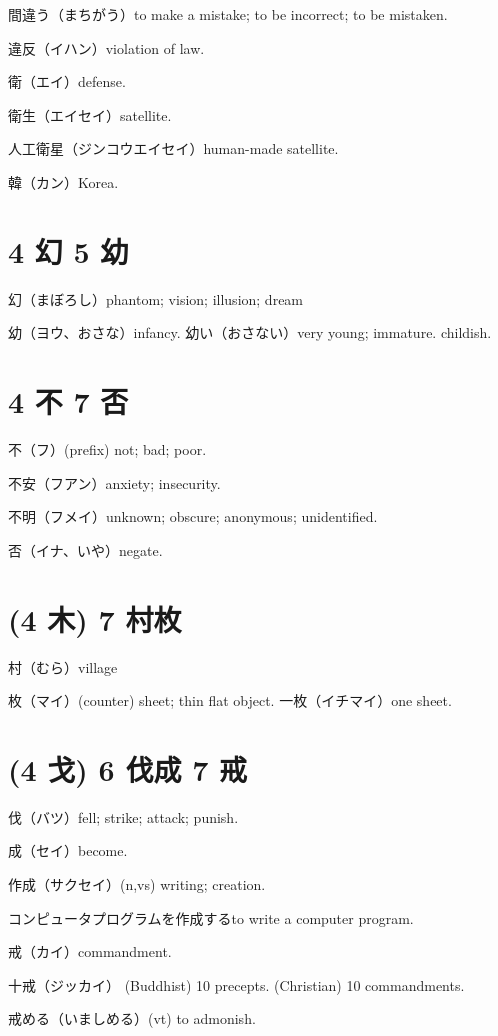 間違う（まちがう）to make a mistake; to be incorrect; to be mistaken.

違反（イハン）violation of law.

衛（エイ）defense.

衛生（エイセイ）satellite.

人工衛星（ジンコウエイセイ）human-made satellite.

韓（カン）Korea.

\section{4 幻 5 幼}

幻（まぼろし）phantom; vision; illusion; dream

幼（ヨウ、おさな）infancy.
幼い（おさない）very young; immature. childish.

\section{4 不 7 否}

不（フ）(prefix) not; bad; poor.

不安（フアン）anxiety; insecurity.

不明（フメイ）unknown; obscure; anonymous; unidentified.

否（イナ、いや）negate.

\section{(4 木) 7 村枚}

村（むら）village

枚（マイ）(counter) sheet; thin flat object.
一枚（イチマイ）one sheet.

\section{(4 戈) 6 伐成 7 戒}

伐（バツ）fell; strike; attack; punish.

成（セイ）become.

作成（サクセイ）(n,vs) writing; creation.

コンピュータプログラムを作成するto write a computer program.

戒（カイ）commandment.

十戒（ジッカイ）
(Buddhist) 10 precepts.
(Christian) 10 commandments.

戒める（いましめる）(vt) to admonish.

